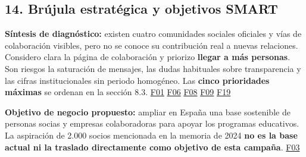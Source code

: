 \documentclass[
]{article}
\begin{document}
\hypertarget{bruxfajula-estratuxe9gica-y-objetivos-smart}{%
\subsection{14. Brújula estratégica y objetivos
SMART}\label{bruxfajula-estratuxe9gica-y-objetivos-smart}}

\textbf{Síntesis de diagnóstico:} existen cuatro comunidades sociales
oficiales y vías de colaboración visibles, pero no se conoce su
contribución real a nuevas relaciones. Considero clara la página de
colaboración y priorizo \textbf{llegar a más personas}. Son riesgos la
saturación de mensajes, las dudas habituales sobre transparencia y las
cifras institucionales sin periodo homogéneo. Las \textbf{cinco
prioridades máximas} se ordenan en la sección 8.3.
\href{https://nascoict.org/}{F01}
\href{https://nascoict.org/transparencia/}{F06}
\href{https://www.instagram.com/nasco_ict/}{F08}
\href{https://www.facebook.com/NascoICT/}{F09}
\href{https://www.aefundraising.org/perfil-donante-2024-que-impulsa-a-los-espanoles-a-colaborar/}{F19}

\textbf{Objetivo de negocio propuesto:} ampliar en España una base
sostenible de personas socias y empresas colaboradoras para apoyar los
programas educativos. La aspiración de 2.000 socios mencionada en la
memoria de 2024 \textbf{no es la base actual ni la traslado directamente
como objetivo de esta campaña}.
\href{https://nascoict.org/wp-content/uploads/MEMORIA-2024.pdf}{F03}
\end{document}
